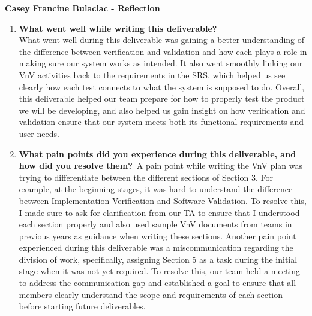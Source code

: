 \documentclass[12pt, titlepage]{article}
\begin{document}
\textbf{Casey Francine Bulaclac - Reflection}
\begin{enumerate}
  \item \textbf{What went well while writing this deliverable?}\\
    What went well during this deliverable was gaining a better
    understanding of the difference between verification and validation
    and how each plays a role in making sure
    our system works as intended. It also went smoothly linking our VnV
    activities back to the requirements in the SRS, which helped us see
    clearly how each test connects to what
    the system is supposed to do. Overall, this deliverable helped our
    team prepare for how to properly test the product we will be
    developing, and also helped us gain
    insight on how verification and validation ensure that our system
    meets both its functional requirements and user needs.
    \item \textbf{What pain points did you experience during this
    deliverable, and how did you resolve them?}\
    A pain point while writing the VnV plan was trying to differentiate
    between the different
    sections of Section 3. For example, at the beginning stages, it was
    hard to understand the difference between
    Implementation Verification and Software Validation. To resolve
    this, I made sure to ask for clarification
    from our TA to ensure that I understood each section properly and
    also used sample VnV documents from teams in previous years as
    guidance when writing these sections. Another pain point
    experienced during this deliverable was a miscommunication
    regarding the division
    of work, specifically, assigning Section 5 as a task during the
    initial stage when it was not yet required. To resolve this, our team
    held a meeting to address the communication gap and established a
    goal to ensure that all members clearly understand the scope and
    requirements of each section
    before starting future deliverables.
\end{enumerate}
\end{document}

